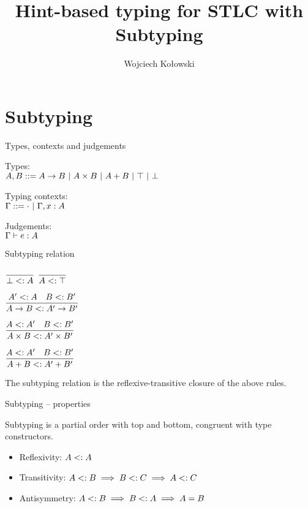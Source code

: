 \documentclass{beamer}
\title{Hint-based typing for STLC with Subtyping}
\author{Wojciech Kołowski}
\date{}
\begin{document}
\frame{\titlepage}

\section{Subtyping}

\begin{frame}{Types, contexts and judgements}

Types: \\
$A, B ::= A \to B \ |\  A \times B \ |\  A + B \ |\  \top \ |\  \bot$

\vspace{2em}

Typing contexts: \\
$\Gamma ::= \cdot \ |\  \Gamma, x : A$

\vspace{2em}

Judgements: \\
$\Gamma \vdash e : A$

\end{frame}

\begin{frame}{Subtyping relation}

\begin{center}
  $\displaystyle \frac{}{\bot <: A} \textsc{\footnotesize{}}$ \quad
  $\displaystyle \frac{}{A <: \top} \textsc{\footnotesize{}}$

  \vspace{2em}

  $\displaystyle \frac{A' <: A \quad B <: B'}{A \to B <: A' \to B'} \textsc{\footnotesize{}}$

  \vspace{2em}

  $\displaystyle \frac{A <: A' \quad B <: B'}{A \times B <: A' \times B'} \textsc{\footnotesize{}}$

  \vspace{2em}

  $\displaystyle \frac{A <: A' \quad B <: B'}{A + B <: A' + B'} \textsc{\footnotesize{}}$
\end{center}

\vspace{2em}

The subtyping relation is the reflexive-transitive closure of the above rules.

\end{frame}

\begin{frame}{Subtyping -- properties}

Subtyping is a partial order with top and bottom, congruent with type constructors.

\begin{itemize}
  \item Reflexivity: $A <: A$
  \item Transitivity: $A <: B \implies B <: C \implies A <: C$
  \item Antisymmetry: $A <: B \implies B <: A \implies A = B$
\end{itemize}

\end{frame}
\end{document}
